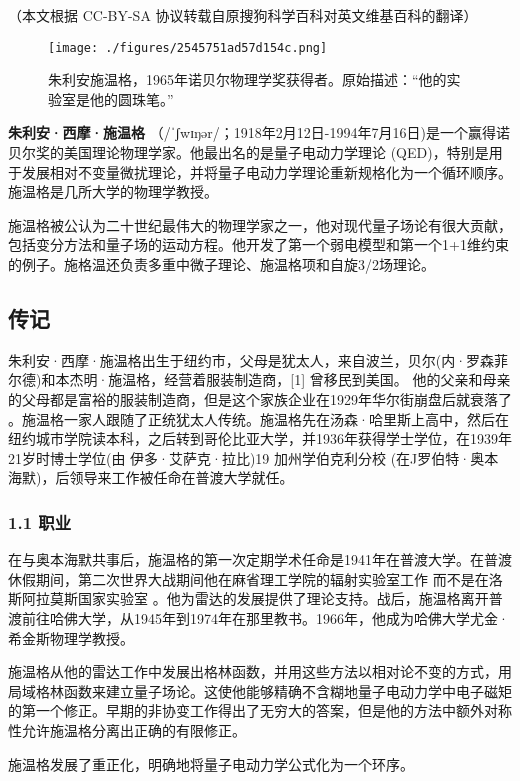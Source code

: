 
（本文根据 CC-BY-SA 协议转载自原搜狗科学百科对英文维基百科的翻译）

\begin{figure}[ht]
\centering
\texttt{[image: ./figures/2545751ad57d154c.png]}
\caption{朱利安施温格，1965年诺贝尔物理学奖获得者。原始描述：“他的实验室是他的圆珠笔。”} \label{fig_Julian_2}
\end{figure}
\textbf{朱利安·西摩·施温格} （/ˈʃwɪŋər/；1918年2月12日-1994年7月16日)是一个赢得诺贝尔奖的美国理论物理学家。他最出名的是量子电动力学理论 (QED)，特别是用于发展相对不变量微扰理论，并将量子电动力学理论重新规格化为一个循环顺序。施温格是几所大学的物理学教授。

施温格被公认为二十世纪最伟大的物理学家之一，他对现代量子场论有很大贡献，包括变分方法和量子场的运动方程。他开发了第一个弱电模型和第一个1+1维约束的例子。施格温还负责多重中微子理论、施温格项和自旋3/2场理论。

\subsection{传记}
朱利安·西摩·施温格出生于纽约市，父母是犹太人，来自波兰，贝尔(内·罗森菲尔德)和本杰明·施温格，经营着服装制造商，[1] 曾移民到美国。 他的父亲和母亲的父母都是富裕的服装制造商，但是这个家族企业在1929年华尔街崩盘后就衰落了 。施温格一家人跟随了正统犹太人传统。施温格先在汤森·哈里斯上高中，然后在纽约城市学院读本科，之后转到哥伦比亚大学，并1936年获得学士学位，在1939年21岁时博士学位(由 伊多·艾萨克·拉比)19 加州学伯克利分校 (在J罗伯特·奥本海默)，后领导来工作被任命在普渡大学就任。

\subsubsection{1.1 职业}
在与奥本海默共事后，施温格的第一次定期学术任命是1941年在普渡大学。在普渡休假期间，第二次世界大战期间他在麻省理工学院的辐射实验室工作 而不是在洛斯阿拉莫斯国家实验室 。他为雷达的发展提供了理论支持。战后，施温格离开普渡前往哈佛大学，从1945年到1974年在那里教书。1966年，他成为哈佛大学尤金·希金斯物理学教授。

施温格从他的雷达工作中发展出格林函数，并用这些方法以相对论不变的方式，用局域格林函数来建立量子场论。这使他能够精确不含糊地量子电动力学中电子磁矩的第一个修正。早期的非协变工作得出了无穷大的答案，但是他的方法中额外对称性允许施温格分离出正确的有限修正。

施温格发展了重正化，明确地将量子电动力学公式化为一个环序。

